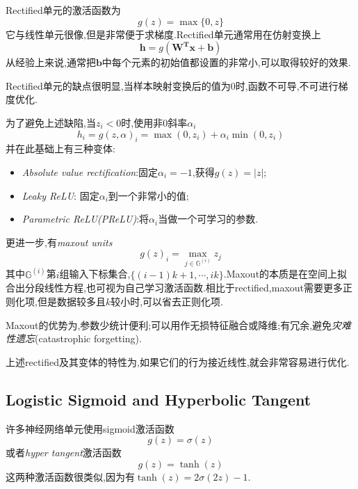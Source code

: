 Rectified单元的激活函数为
\begin{equation}
g(z)=\max\{0,z\}
\end{equation}
它与线性单元很像,但是非常便于求梯度.Rectified单元通常用在仿射变换上
\begin{equation}
\bm h=g(\bm{W^Tx+b})
\end{equation}
从经验上来说,通常把$\bm b$中每个元素的初始值都设置的非常小,可以取得较好的效果.

Rectified单元的缺点很明显,当样本映射变换后的值为$0$时,函数不可导,不可进行梯度优化.

为了避免上述缺陷,当$z_i<0$时,使用非$0$斜率$\alpha_i$
\begin{equation}
h_i=g(z,\alpha)_i=\max(0,z_i)+\alpha_i\min(0,z_i)
\end{equation}
并在此基础上有三种变体:
\begin{itemize}
\item \textit{Absolute value rectification}:固定$\alpha_i=-1$,获得$g(z)=|z|$;
\item \textit{Leaky ReLU}: 固定$\alpha_i$到一个非常小的值;
\item \textit{Parametric ReLU(PReLU)}:将$\alpha_i$当做一个可学习的参数.
\end{itemize}

更进一步,有\textit{maxout units}
\begin{equation}
g(z)_i=\max_{j\in\mathbb G^{(i)}}z_j
\end{equation}
其中$\mathbb G^{(i)}$第$i$组输入下标集合,$\{(i-1)k+1,\cdots,ik\}$.Maxout的本质是在空间上拟合出分段线性方程,也可视为自己学习激活函数.相比于rectified,maxout需要更多正则化项,但是数据较多且$k$较小时,可以省去正则化项.

Maxout的优势为,参数少统计便利;可以用作无损特征融合或降维;有冗余,避免\textit{灾难性遗忘}(catastrophic forgetting).

上述rectified及其变体的特性为,如果它们的行为接近线性,就会非常容易进行优化.

\subsection{Logistic Sigmoid and Hyperbolic Tangent}

许多神经网络单元使用sigmoid激活函数
\begin{equation}
g(z)=\sigma(z)
\end{equation}
或者\textit{hyper tangent}激活函数
\begin{equation}
g(z)=\tanh(z)
\end{equation}
这两种激活函数很类似,因为有$\tanh(z)=2\sigma(2z)-1$.

